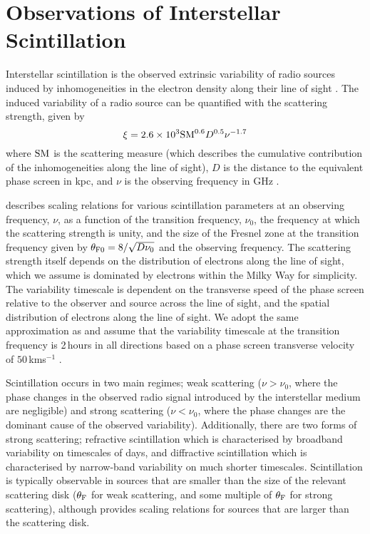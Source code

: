 \section{Observations of Interstellar Scintillation}
\vspace{-2pt}
Interstellar scintillation is the observed extrinsic variability of radio sources induced by inhomogeneities in the electron density along their line of sight \citep{1995ApJ...443..209A}. The induced variability of a radio source can be quantified with the scattering strength, given by
\vspace{-2pt}
\begin{equation}
    \xi=2.6\times 10^{3} {\rm SM}^{0.6}D^{0.5}\nu^{-1.7}
\end{equation}
\vspace{-2pt}where ${\rm SM}$ is the scattering measure (which describes the cumulative contribution of the inhomogeneities along the line of sight), $D$ is the distance to the equivalent phase screen in kpc, and $\nu$ is the observing frequency in GHz \citep{1992RSPTA.341..151N,1993ApJ...411..674T,1998MNRAS.294..307W}.

\citet{1998MNRAS.294..307W,2001MNRAS.321..176W} describes scaling relations for various scintillation parameters at an observing frequency, $\nu$, as a function of the transition frequency, $\nu_0$, the frequency at which the scattering strength is unity, and the size of the Fresnel zone at the transition frequency given by $\theta_{\rm F0}=8/\sqrt{D\nu_0}$ and the observing frequency. The scattering strength itself depends on the distribution of electrons along the line of sight, which we assume is dominated by electrons within the Milky Way for simplicity. The variability timescale is dependent on the transverse speed of the phase screen relative to the observer and source across the line of sight, and the spatial distribution of electrons along the line of sight. We adopt the same approximation as \citet{1998MNRAS.294..307W} and assume that the variability timescale at the transition frequency is 2\,hours in all directions based on a phase screen transverse velocity of $50\,$kms$^{-1}$ \citep{1995A&A...293..479R}.

Scintillation occurs in two main regimes; weak scattering ($\nu>\nu_0$, where the phase changes in the observed radio signal introduced by the interstellar medium are negligible) and strong scattering ($\nu<\nu_0$, where the phase changes are the dominant cause of the observed variability). Additionally, there are two forms of strong scattering; refractive scintillation which is characterised by broadband variability on timescales of days, and diffractive scintillation which is characterised by narrow-band variability on much shorter timescales. Scintillation is typically observable in sources that are smaller than the size of the relevant scattering disk ($\theta_{\rm F}$ for weak scattering, and some multiple of $\theta_{\rm F}$ for strong scattering), although \citet{1992RSPTA.341..151N} provides scaling relations for sources that are larger than the scattering disk.

